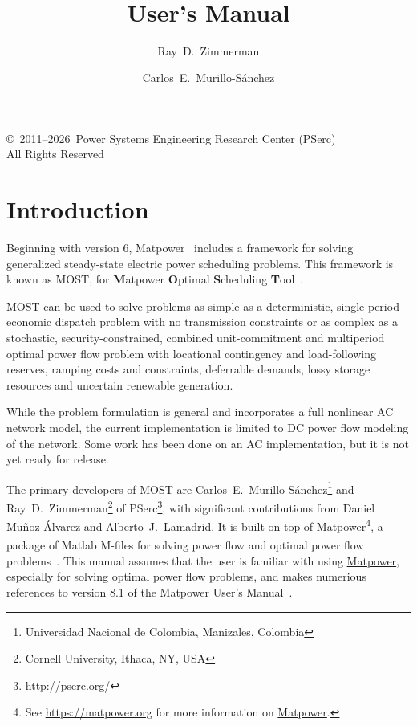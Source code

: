 \documentclass[12pt]{article}
\title{\mostname{}\\\most{} \mostver{}\\
User's Manual}
\author{Ray~D.~Zimmerman \and Carlos~E.~Murillo-S\'anchez}
\newcommand{\mpver}[0]{8.1}
\newcommand{\matlab}[0]{{\sc Matlab}}
\newcommand{\matpower}[0]{{\sc Matpower}}
\newcommand{\matpowerurl}[0]{https://matpower.org}
\newcommand{\matpowerlink}[0]{\href{\matpowerurl}{\matpower{}}}
\newcommand{\most}[0]{{MOST}}
\newcommand{\mostname}[0]{{{\bf M}{\sc atpower} \textbf{O}ptimal \textbf{S}cheduling \textbf{T}ool}}
\newcommand{\pserc}[0]{{\sc PSerc}}
\newcommand{\PSERC}[0]{{Power Systems Engineering Research Center (\pserc{})}}
\newcommand{\mumurl}[0]{https://matpower.org/docs/MATPOWER-manual-\mpver.pdf}
\newcommand{\mum}[0]{\href{\mumurl}{\matpower{} User's Manual}}
\numberwithin{equation}{section}
\numberwithin{table}{section}
\numberwithin{figure}{section}
\begin{document}
\maketitle
\thispagestyle{empty}
\vfill
\begin{center}
{\scriptsize
\copyright~2011--2026~\PSERC{}\\
All Rights Reserved}
\end{center}

\clearpage
\tableofcontents
\clearpage
\listoffigures
\listoftables

\clearpage
\section{Introduction}

Beginning with version 6, \matpower{}~\cite{zimmerman2011,matpower,matpower_manual} includes a framework for solving generalized steady-state electric power scheduling problems. This framework is known as \most{}, for \mostname{}~\cite{murillo-sanchez2013a,lamadrid2018}.

\most{} can be used to solve problems as simple as a deterministic, single period economic dispatch problem with no transmission constraints or as complex as a stochastic, security-constrained, combined unit-commitment and multiperiod optimal power flow problem with locational contingency and load-following reserves, ramping costs and constraints, deferrable demands, lossy storage resources and uncertain renewable generation.

While the problem formulation is general and incorporates a full nonlinear AC network model, the current implementation is limited to DC power flow modeling of the network. Some work has been done on an AC implementation, but it is not yet ready for release.

The primary developers of \most{} are Carlos~E.~Murillo-S\'anchez\footnote{Universidad Nacional de Colombia, Manizales, Colombia} and Ray~D.~Zimmerman\footnote{Cornell University, Ithaca, NY, USA} of \pserc{}\footnote{\url{http://pserc.org/}}, with significant contributions from Daniel Mu\~noz-\'Alvarez and Alberto~J.~Lamadrid. It is built on top of \matpowerlink{}\footnote{See \url{\matpowerurl} for more information on \matpowerlink{}.}, a package of \matlab{}\textsuperscript{\tiny \textregistered} M-files for solving power flow and optimal power flow problems~\cite{zimmerman2011, zimmerman2009}. This manual assumes that the user is familiar with using \matpowerlink{}, especially for solving optimal power flow problems, and makes numerious references to version \mpver{} of the \mum{}~\cite{matpower_manual}.
\end{document}
